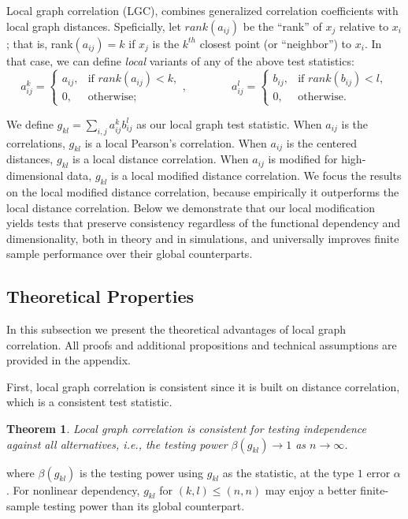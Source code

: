 \documentclass[11pt]{article}
\newtheorem{thm}{Theorem}
\begin{document}
 Local graph correlation (LGC), combines generalized correlation coefficients with local graph distances.  Speficially, let $rank(a_{ij})$  be the ``rank'' of $x_j$ relative to $x_i$; that is, rank$(a_{ij})=k$ if $x_j$ is the $k^{th}$ closest point (or ``neighbor'') to $x_i$.  In that case, we can define \emph{local} variants of any of the above test statistics:
\begin{equation}
    a_{ij}^k=
    \begin{cases}
      a_{ij}, & \text{if }rank(a_{ij}) < k, \\
      0, & \text{otherwise};
    \end{cases}, \qquad \qquad
    a_{ij}^l=
    \begin{cases}
      b_{ij}, & \text{if }rank(b_{ij}) < l, \\
      0, & \text{otherwise}.
    \end{cases}
\end{equation}

We define $g_{kl}=\sum_{i,j} a_{ij}^k b_{ij}^l$ as our local graph test statistic.  
When $a_{ij}$ is the correlations, $g_{kl}$ is a local Pearson's correlation.
When $a_{ij}$ is the centered distances, $g_{kl}$ is a local distance correlation.  
When $a_{ij}$ is modified for high-dimensional data, $g_{kl}$ is a local modified distance correlation.  
We focus the results on the local modified distance correlation, because empirically it outperforms the local distance correlation.  Below we demonstrate that our local modification yields tests that preserve consistency regardless of the functional dependency and dimensionality, both in theory and in simulations, and universally improves finite sample performance over their global counterparts.






\subsection{Theoretical Properties}
\label{main4}
In this subsection we present the theoretical advantages of local graph correlation. All proofs and additional propositions and technical assumptions are provided in the appendix. 

First, local graph correlation is consistent since it is built on distance correlation, which is a consistent test statistic. 
\begin{thm}
\label{thm1}
Local graph correlation is consistent for testing independence against all alternatives, i.e., the testing power $\beta(g_{kl}) \rightarrow 1$ as $n \rightarrow \infty$. 
\end{thm}
where $\beta(g_{kl})$ is the testing power using $g_{kl}$ as the statistic, at the type $1$ error $\alpha$.
For nonlinear dependency, $g_{kl}$ for $(k,l) \leq (n,n)$ may enjoy a better finite-sample testing power than its global counterpart. 
\end{document}
